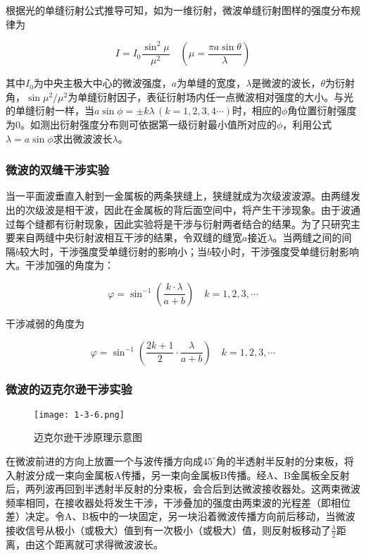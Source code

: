 \documentclass[12pt]{article}
\begin{document}
根据光的单缝衍射公式推导可知，如为一维衍射，微波单缝衍射图样的强度分布规律为

\[
    I=I_0\frac{\sin^2\mu}{\mu^2}\quad(\mu=\frac{\pi a\sin\theta}{\lambda})
\]

其中$ I_0 $为中央主极大中心的微波强度，$ a $为单缝的宽度，$ \lambda $是微波的波长，$ \theta $为衍射角，$\sin\mu^2/\mu^2$为单缝衍射因子，表征衍射场内任一点微波相对强度的大小。与光的单缝衍射一样，当$ a\sin\phi=\pm k\lambda\,(k=1,2,3,4\cdots) $时，相应的$ \phi $角位置衍射强度为0。如测出衍射强度分布则可依据第一级衍射最小值所对应的$ \phi $，利用公式$ \lambda=a\sin\phi $求出微波波长$\lambda$。

\subsubsection{微波的双缝干涉实验}
当一平面波垂直入射到一金属板的两条狭缝上，狭缝就成为次级波波源。由两缝发出的次级波是相干波，因此在金属板的背后面空间中，将产生干涉现象。由于波通过每个缝都有衍射现象，因此实验将是干涉与衍射两者结合的结果。为了只研究主要来自两缝中央衍射波相互干涉的结果，令双缝的缝宽$ a $接近$ \lambda $。当两缝之间的间隔$ b $较大时，干涉强度受单缝衍射的影响小；当$ b $较小时，干涉强度受单缝衍射影响大。干涉加强的角度为：

\[
    \varphi=\sin^{-1}\left(\frac{k\cdot\lambda}{a+b}\right)\quad k=1,2,3,\cdots
\]

干涉减弱的角度为

\[
    \varphi=\sin^{-1}\left(\frac{2k+1}{2}\cdot\frac{\lambda}{a+b}\right)\quad k=1,2,3,\cdots
\]

\subsubsection{微波的迈克尔逊干涉实验}
\begin{figure}[htbp]
    \centering
    \texttt{[image: 1-3-6.png]}
    \caption{迈克尔逊干涉原理示意图}
\end{figure}

在微波前进的方向上放置一个与波传播方向成$ 45^{\circ} $角的半透射半反射的分束板，将入射波分成一束向金属板A传播，另一束向金属板B传播。经A、B金属板全反射后，两列波再回到半透射半反射的分束板，会合后到达微波接收器处。这两束微波频率相同，在接收器处将发生干涉，干涉叠加的强度由两束波的光程差（即相位差）决定。令A、B板中的一块固定，另一块沿着微波传播方向前后移动，当微波接收信号从极小（或极大）值到有一次极小（或极大）值，则反射板移动了$\frac{\lambda}{2}$距离，由这个距离就可求得微波波长。
\end{document}
